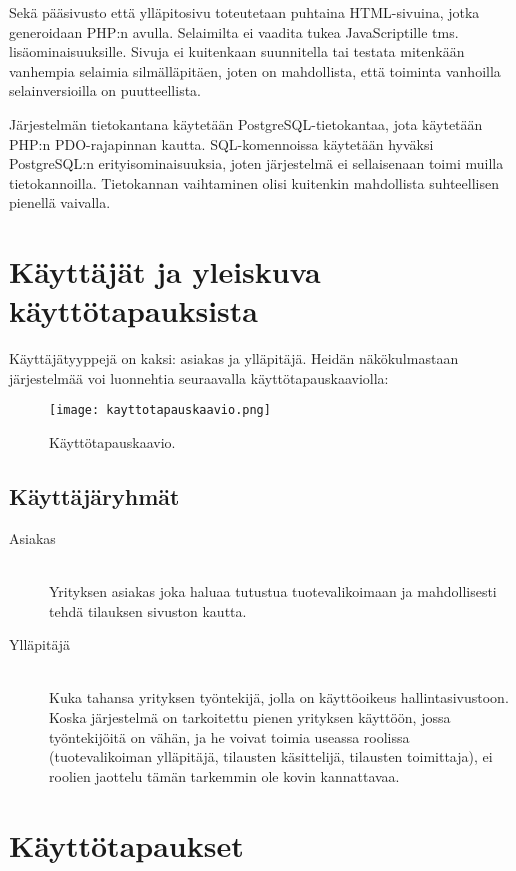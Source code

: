 \documentclass[a4paper, 12pt, finnish]{article}
\begin{document}
Sekä pääsivusto että ylläpitosivu toteutetaan puhtaina HTML-sivuina, jotka generoidaan PHP:n avulla. Selaimilta ei vaadita tukea JavaScriptille tms. lisäominaisuuksille. Sivuja ei kuitenkaan suunnitella tai testata mitenkään vanhempia selaimia silmälläpitäen, joten on mahdollista, että toiminta vanhoilla selainversioilla on puutteellista. 

Järjestelmän tietokantana käytetään PostgreSQL-tietokantaa, jota käytetään PHP:n PDO-rajapinnan kautta. SQL-komennoissa käytetään hyväksi PostgreSQL:n erityisominaisuuksia, joten järjestelmä ei sellaisenaan toimi muilla tietokannoilla. Tietokannan vaihtaminen olisi kuitenkin mahdollista suhteellisen pienellä vaivalla.

\section{Käyttäjät ja yleiskuva käyttötapauksista}

Käyttäjätyyppejä on kaksi: asiakas ja ylläpitäjä. Heidän näkökulmastaan järjestelmää voi luonnehtia seuraavalla käyttötapauskaaviolla:

\begin{figure}[H]
	\begin{center}
	\caption{Käyttötapauskaavio.}
	\texttt{[image: kayttotapauskaavio.png]}
	\end{center}
\end{figure}

\subsection*{Käyttäjäryhmät}

\begin{description}
\item[Asiakas]\mbox{}\\Yrityksen asiakas joka haluaa tutustua tuotevalikoimaan ja mahdollisesti tehdä tilauksen sivuston kautta.
\item[Ylläpitäjä]\mbox{}\\Kuka tahansa yrityksen työntekijä, jolla on käyttöoikeus hallintasivustoon. Koska järjestelmä on tarkoitettu pienen yrityksen käyttöön, jossa työntekijöitä on vähän, ja he voivat toimia useassa roolissa (tuotevalikoiman ylläpitäjä, tilausten käsittelijä, tilausten toimittaja), ei roolien jaottelu tämän tarkemmin ole kovin kannattavaa.
\end{description}

\section{Käyttötapaukset}
\end{document}
